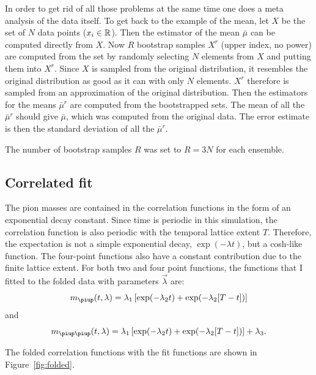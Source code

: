 \documentclass[11pt, english, fleqn, DIV=10, headinclude]{scrartcl}
\begin{document}
In order to get rid of all those problems at the same time one does a meta
analysis of the data itself. To get back to the example of the mean, let $X$ be
the set of $N$ data points ($x_i \in \mathbb R$). Then the estimator of the mean
$\bar\mu$ can be computed directly from $X$. Now $R$ bootstrap samples $X^r$
(upper index, no power) are computed from the set by randomly selecting $N$
elements from $X$ and putting them into $X^r$. Since $X$ is sampled from the
original distribution, it resembles the original distribution as good as it can
with only $N$ elements. $X^r$ therefore is sampled from an approximation of the
original distribution. Then the estimators for the means $\bar\mu^r$ are
computed from the bootstrapped sets. The mean of all the $\bar\mu^r$ should
give $\bar\mu$, which was computed from the original data. The error estimate
is then the standard deviation of all the $\bar\mu^r$.
\parencite[Slide~5]{Oser/Bootstrap}

The number of bootstrap samples $R$ was set to $R = 3N$ for each ensemble.

\subsection{Correlated fit}
\label{sec:correlated_fit}

The pion masses are contained in the correlation functions in the form of an
exponential decay constant. Since time is periodic in this simulation, the
correlation function is also periodic with the temporal lattice extent $T$.
Therefore, the expectation is not a simple exponential decay, $\exp(-\lambda
t)$, but a cosh-like function. The four-point functions also have a constant
contribution due to the finite lattice extent. For both two and four point
functions, the functions that I fitted to the folded data with parameters $\vec
\lambda$ are:
\begin{equation}
    \label{eq:fit2}
    m_\piup(t, \lambda) = \lambda_1 \sbr{\exp(-\lambda_2 t) + \exp(-\lambda_2
    [T - t])}
\end{equation}
and
\begin{equation}
    \label{eq:fit4}
    m_{\piup\piup}(t, \lambda) = \lambda_1 \sbr{\exp(-\lambda_2 t) + \exp(-\lambda_2
    [T - t])} + \lambda_3.
\end{equation}

The folded correlation functions with the fit functions are shown in
Figure~\ref{fig:folded}.
\end{document}
